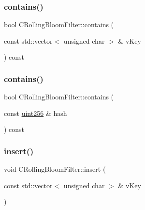 \subsubsection{\texorpdfstring{contains()}{contains()}\hspace{0.1cm}{\footnotesize\ttfamily [1/2]}}
{\footnotesize\ttfamily bool C\+Rolling\+Bloom\+Filter\+::contains (\begin{DoxyParamCaption}\item[{const std\+::vector$<$ unsigned char $>$ \&}]{v\+Key }\end{DoxyParamCaption}) const}

\mbox{\label{class_c_rolling_bloom_filter_ae05528befdb97a19a1b31f30796ca7bd}} 
\subsubsection{\texorpdfstring{contains()}{contains()}\hspace{0.1cm}{\footnotesize\ttfamily [2/2]}}
{\footnotesize\ttfamily bool C\+Rolling\+Bloom\+Filter\+::contains (\begin{DoxyParamCaption}\item[{const \mbox{\hyperlink{classuint256}{uint256}} \&}]{hash }\end{DoxyParamCaption}) const}

\mbox{\label{class_c_rolling_bloom_filter_a0fedbf0cf38c9070a30c7c5f8299f5d7}} 
\subsubsection{\texorpdfstring{insert()}{insert()}\hspace{0.1cm}{\footnotesize\ttfamily [1/2]}}
{\footnotesize\ttfamily void C\+Rolling\+Bloom\+Filter\+::insert (\begin{DoxyParamCaption}\item[{const std\+::vector$<$ unsigned char $>$ \&}]{v\+Key }\end{DoxyParamCaption})}

\mbox{\label{class_c_rolling_bloom_filter_aff399e835a59b4ced4d9af3ddce363a0}} 
